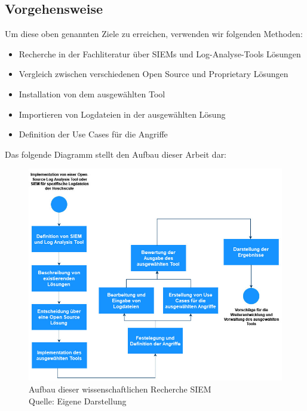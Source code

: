 \newpage
\subsection{Vorgehensweise}
Um diese oben genannten Ziele zu erreichen, verwenden wir folgenden Methoden: 

{
\begin{itemize}[noitemsep]
   \item	Recherche in der Fachliteratur über SIEMs und Log-Analyse-Tools Lösungen 
   \item	Vergleich zwischen verschiedenen Open Source und Proprietary Lösungen 
   \item	Installation von dem ausgewählten Tool 
   \item	Importieren von Logdateien in der ausgewählten Lösung 
   \item	Definition der Use Cases für die Angriffe
\end{itemize}
}

Das folgende Diagramm stellt den Aufbau dieser Arbeit dar:

\begin{figure}[H]
   \centering
   \includegraphics[width=1\textwidth]{assets/1_p1.jpg}
   \caption{Aufbau dieser wissenschaftlichen Recherche \gls{SIEM} \\Quelle: Eigene Darstellung }
   \centering
\end{figure}



